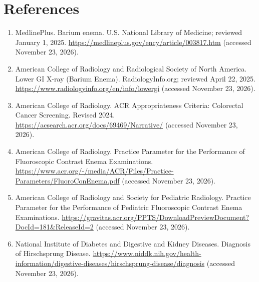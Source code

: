\section*{References}
\begin{enumerate}
  \item MedlinePlus. Barium enema. U.S. National Library of Medicine; reviewed January 1, 2025. \url{https://medlineplus.gov/ency/article/003817.htm} (accessed November 23, 2026).
  \item American College of Radiology and Radiological Society of North America. Lower GI X-ray (Barium Enema). RadiologyInfo.org; reviewed April 22, 2025. \url{https://www.radiologyinfo.org/en/info/lowergi} (accessed November 23, 2026).
  \item American College of Radiology. ACR Appropriateness Criteria: Colorectal Cancer Screening. Revised 2024. \url{https://acsearch.acr.org/docs/69469/Narrative/} (accessed November 23, 2026).
  \item American College of Radiology. Practice Parameter for the Performance of Fluoroscopic Contrast Enema Examinations. \url{https://www.acr.org/-/media/ACR/Files/Practice-Parameters/FluoroConEnema.pdf} (accessed November 23, 2026).
  \item American College of Radiology and Society for Pediatric Radiology. Practice Parameter for the Performance of Pediatric Fluoroscopic Contrast Enema Examinations. \url{https://gravitas.acr.org/PPTS/DownloadPreviewDocument?DocId=181&ReleaseId=2} (accessed November 23, 2026).
  \item National Institute of Diabetes and Digestive and Kidney Diseases. Diagnosis of Hirschsprung Disease. \url{https://www.niddk.nih.gov/health-information/digestive-diseases/hirschsprung-disease/diagnosis} (accessed November 23, 2026).
\end{enumerate}

\clearpage
